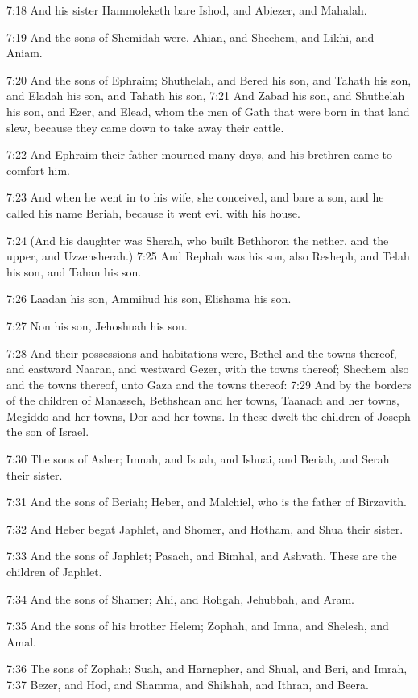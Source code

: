 7:18 And his sister Hammoleketh bare Ishod, and Abiezer, and Mahalah.

7:19 And the sons of Shemidah were, Ahian, and Shechem, and Likhi, and
Aniam.

7:20 And the sons of Ephraim; Shuthelah, and Bered his son, and Tahath
his son, and Eladah his son, and Tahath his son, 7:21 And Zabad his
son, and Shuthelah his son, and Ezer, and Elead, whom the men of Gath
that were born in that land slew, because they came down to take away
their cattle.

7:22 And Ephraim their father mourned many days, and his brethren came
to comfort him.

7:23 And when he went in to his wife, she conceived, and bare a son,
and he called his name Beriah, because it went evil with his house.

7:24 (And his daughter was Sherah, who built Bethhoron the nether, and
the upper, and Uzzensherah.)  7:25 And Rephah was his son, also
Resheph, and Telah his son, and Tahan his son.

7:26 Laadan his son, Ammihud his son, Elishama his son.

7:27 Non his son, Jehoshuah his son.

7:28 And their possessions and habitations were, Bethel and the towns
thereof, and eastward Naaran, and westward Gezer, with the towns
thereof; Shechem also and the towns thereof, unto Gaza and the towns
thereof: 7:29 And by the borders of the children of Manasseh,
Bethshean and her towns, Taanach and her towns, Megiddo and her towns,
Dor and her towns. In these dwelt the children of Joseph the son of
Israel.

7:30 The sons of Asher; Imnah, and Isuah, and Ishuai, and Beriah, and
Serah their sister.

7:31 And the sons of Beriah; Heber, and Malchiel, who is the father of
Birzavith.

7:32 And Heber begat Japhlet, and Shomer, and Hotham, and Shua their
sister.

7:33 And the sons of Japhlet; Pasach, and Bimhal, and Ashvath. These
are the children of Japhlet.

7:34 And the sons of Shamer; Ahi, and Rohgah, Jehubbah, and Aram.

7:35 And the sons of his brother Helem; Zophah, and Imna, and Shelesh,
and Amal.

7:36 The sons of Zophah; Suah, and Harnepher, and Shual, and Beri, and
Imrah, 7:37 Bezer, and Hod, and Shamma, and Shilshah, and Ithran, and
Beera.

